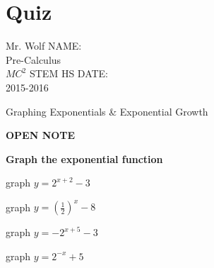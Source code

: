 \documentclass[12pt]{article}
\begin{document}
\pagebreak

\section*{Quiz}

Mr. Wolf \hfill NAME:\underline{\hspace{3in}}\\ 
Pre-Calculus \\ 
$MC^2$ STEM HS \hfill DATE:\underline{\hspace{2in}}\\
2015-2016\\

\begin{center}
	\begin{Large}

		 Graphing Exponentials \& Exponential Growth\\

	\end{Large}
	
		\textbf{OPEN NOTE} \\
\end{center}


\textbf{Graph the exponential function}\\

\begin{enumerate}[resume]
\begin{multicols}{2}

\item graph $y=2^{x+2}-3$\\


\item graph $y=\left(\frac{1}{2} \right)^{x}-8$\\


\item graph $y=-2^{x+5}-3$\\


\item  graph $y=2^{-x}+5$\\


\end{multicols}

\end{enumerate}
\end{document}
